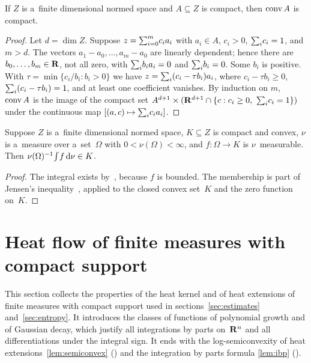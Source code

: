 \documentclass[a4paper,twoside,leqno]{article}
\begin{document}
\begin{lemma}
    \label{lem:hull}
    If $Z$ is a~finite dimensional normed space and $A \subseteq Z$ is compact, then $\operatorname{conv} A$ is
    compact.
\end{lemma}

\begin{proof}
    Let $d = \dim Z$. Suppose $z = {\textstyle\sum_{i=0}^{m}} c_i a_i$ with $a_i \in A$, $c_i > 0$,
    ${\textstyle\sum_{i}^{}} c_i = 1$, and $m > d$. The vectors $a_1 - a_0, \ldots, a_m - a_0$ are linearly
    dependent; hence there are $b_0, \ldots, b_m \in \mathbf{R}$, not all zero, with ${\textstyle\sum_{i}^{}} b_i
    a_i = 0$ and ${\textstyle\sum_{i}^{}} b_i = 0$. Some $b_i$ is positive. With $\tau = \min \{ c_i / b_i :
    b_i > 0 \}$ we have $z = {\textstyle\sum_{i}^{}} (c_i - \tau b_i) a_i$, where $c_i - \tau b_i \ge 0$,
    ${\textstyle\sum_{i}^{}} (c_i - \tau b_i) = 1$, and at least one coefficient vanishes. By induction on
    $m$, $\operatorname{conv} A$ is the image of the compact set $A^{d+1} \times (\mathbf{R}^{d+1} \cap \{ c : c_i \ge
    0,\ {\textstyle\sum_{i}^{}} c_i = 1 \})$ under the continuous map $[(a,c) \mapsto {\textstyle\sum_{i}^{}} c_i
    a_i]$.
\end{proof}

\begin{lemma}
    \label{lem:barycentre}
    Suppose $Z$ is a~finite dimensional normed space, $K \subseteq Z$ is compact and convex, $\nu$
    is a~measure over a~set~$\Omega$ with $0 < \nu(\Omega) < \infty$, and $f : \Omega \to K$ is
    $\nu$~measurable. Then $\nu(\Omega)^{-1} {\textstyle\int_{}^{}} f \,\mathrm{d} \nu \in K$.
\end{lemma}

\begin{proof}
    The integral exists by~\cite[2.4.12]{Federer1969}, because $f$ is bounded. The membership is
    part of Jensen's inequality~\cite[2.4.19]{Federer1969}, applied to the closed convex set~$K$
    and the zero function on~$K$.
\end{proof}

\section{Heat flow of finite measures with compact support}
\label{sec:heat}

\begin{miniremark}
    \label{mr:sec_heat}
    This section collects the properties of the heat kernel and of heat extensions of finite
    measures with compact support used in sections~\ref{sec:estimates} and~\ref{sec:entropy}. It
    introduces the classes of functions of polynomial growth and of Gaussian decay, which justify
    all integrations by parts on~$\mathbf{R}^{n}$ and all differentiations under the integral sign.
    It ends with the log-semiconvexity of heat extensions~\ref{lem:semiconvex}
    (\cite[(3.16)]{DePhilippisGennaioliPigatiRindler2026}) and the integration by parts formula
    \ref{lem:ibp} (\cite[(3.17)]{DePhilippisGennaioliPigatiRindler2026}).
\end{miniremark}
\end{document}
